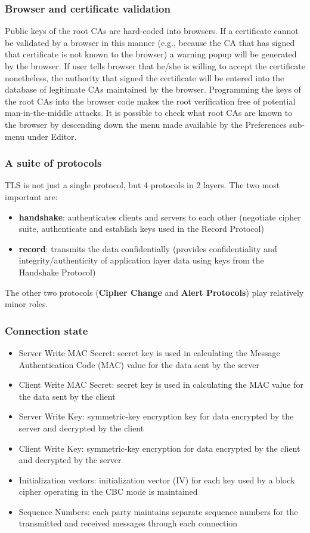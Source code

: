 \documentclass[a4paper, 10pt, titlepage]{article}
\begin{document}
\subsubsection{Browser and certificate validation}
Public keys of the root CAs are hard-coded into browsers. If a certificate cannot be validated by a browser in this manner (e.g., because the CA that has signed that certificate is not known to the browser) a warning popup will be generated by the browser. If user tells browser that he/she is willing to accept the certificate nonetheless, the authority that signed the certificate will be entered into the database of legitimate CAs maintained by the browser. Programming the keys of the root CAs into the browser code makes the root verification free of potential man-in-the-middle attacks. It is possible to check what root CAs are known to the browser by descending down the menu made available by the Preferences sub-menu under Editor.

\subsubsection{A suite of protocols}
TLS is not just a single protocol, but 4 protocols in 2 layers. The two most important are:
\begin{itemize}
\item \textbf{handshake}: authenticates clients and servers to each other (negotiate cipher suite, authenticate and establish keys used in the Record Protocol)
\item \textbf{record}: transmits the data confidentially (provides confidentiality and integrity/authenticity of application layer data using keys from the Handshake Protocol)
\end{itemize}
The other two protocols (\textbf{Cipher Change} and \textbf{Alert Protocols}) play relatively minor roles.

\subsubsection{Connection state}
\begin{itemize}
\item Server Write MAC Secret: secret key is used in calculating the Message Authentication Code (MAC) value for the data sent by the server
\item Client Write MAC Secret: secret key is used in calculating the MAC value for the data sent by the client
\item Server Write Key: symmetric-key encryption key for data encrypted by the server and decrypted by the client
\item Client Write Key: symmetric-key encryption for data encrypted by the client and decrypted by the server
\item Initialization vectors: initialization vector (IV) for each key used by a block cipher operating in the CBC mode is maintained
\item Sequence Numbers: each party maintains separate sequence numbers for the transmitted and received messages through each connection
\end{itemize}
\end{document}
